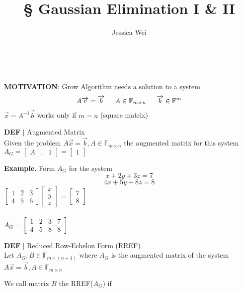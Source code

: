 \documentclass [12pt]{article}
\begin{document}
\begin{center}\title*{\Large \S {} Gaussian Elimination I \& II}\\\author*{Jessica Wei} \end{center}
\normalsize
\noindent\textbf{MOTIVATION}: Grow Algorithm needs a solution to a system 
\[A\overrightarrow{v}=\overrightarrow{b}\indent A\in\mathbb{F}_{m\times n}\indent \overrightarrow{b}\in\mathbb{F}^m\]
$\overrightarrow{x}=A^{-1}\overrightarrow{b}$ works only if $m=n$ (square matrix)\\
\begin{framed}
\noindent\textbf{DEF} $|$ Augmented Matrix\\
Given the problem $A\overrightarrow{x}=\overrightarrow{b},A\in\mathbb{F}_{m\times n}$ the augmented matrix for this system\\
$A_G=\begin{bmatrix}
A&.&1
\end{bmatrix}=\begin{bmatrix}
1
\end{bmatrix}$
\end{framed}
\noindent\textbf{Example. }Form $A_G$ for the system
\[x+2y+3z=7\]
\[4x+5y+8z=8\]
$\begin{bmatrix}
1&2&3\\
4&5&6
\end{bmatrix}\begin{bmatrix}
x\\
y\\
z
\end{bmatrix}=\begin{bmatrix}
7\\
8
\end{bmatrix}$\\\\
$A_G=\begin{bmatrix}
1&2&3&7\\
4&5&8&8
\end{bmatrix}$
\begin{framed}
\noindent\textbf{DEF} $|$ Reduced Row-Echelon Form (RREF)\\
Let $A_G,B\in\mathbb{F}_{m\times (n+1)}$ where $A_G$ is the augmented matrix of the system $A\overrightarrow{x}=\overrightarrow{b}, A\in\mathbb{F}_{m\times n}$
\end{framed}
We call matrix $B$ the RREF($A_G$) if 
\end{document}
